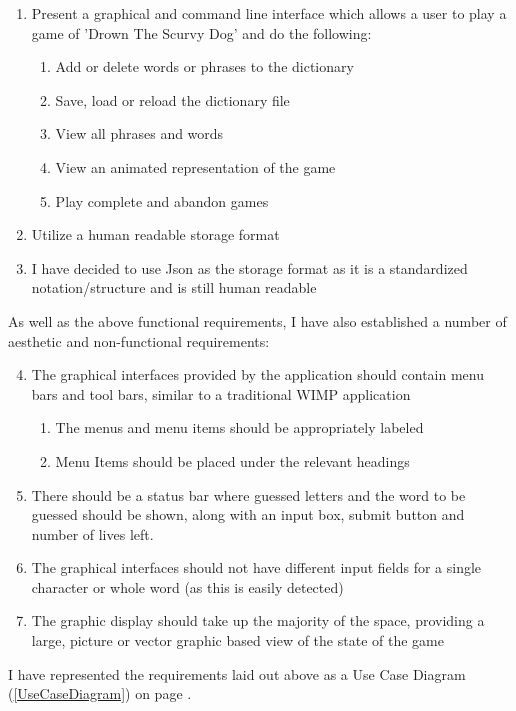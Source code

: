 \documentclass[a4paper, 11pt]{article}
\begin{document}
\begin{enumerate}
\item Present a graphical and command line interface which allows a user to play a game of 'Drown The Scurvy Dog' and do the following:
\begin{enumerate}
\item Add or delete words or phrases to the dictionary
\item Save, load or reload the dictionary file
\item View all phrases and words
\item View an animated representation of the game
\item Play complete and abandon games
\end{enumerate}
\item Utilize a human readable storage format
\item I have decided to use Json as the storage format as it is a standardized notation/structure and is still human readable
\end{enumerate}

As well as the above functional requirements, I have also established a number of aesthetic and non-functional requirements:

\begin{enumerate}
\setcounter{enumi}{3}
\item The graphical interfaces provided by the application should contain menu bars and tool bars, similar to a traditional WIMP application
\begin{enumerate}
\item The menus and menu items should be appropriately labeled
\item Menu Items should be placed under the relevant headings
\end{enumerate}
\item There should be a status bar where guessed letters and the word to be guessed should be shown, along with an input box, submit button and number of lives left.
\item The graphical interfaces should not have different input fields for a single character or whole word (as this is easily detected)
\item The graphic display should take up the majority of the space, providing a large, picture or vector graphic based view of the state of the game
\end{enumerate}

I have represented the requirements laid out above as a Use Case Diagram (\ref{UseCaseDiagram}) on page \pageref{UseCaseDiagram}.
\end{document}
